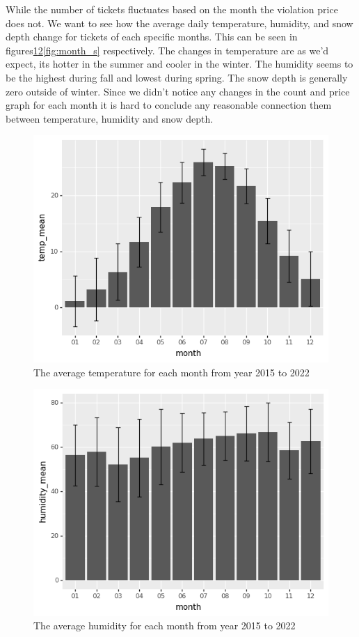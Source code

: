 \documentclass[12pt]{fphw}
\begin{document}
While the number of tickets fluctuates based on the month the violation price does not.
We want to see how the average daily temperature, humidity, and snow depth change for tickets of each specific months. This can be seen in figures\ref{fig:month_t}\ref{fig:month_h}\ref{fig:month_s} respectively.
The changes in temperature are as we'd expect, its hotter in the summer and cooler in the winter. The humidity seems to be the highest during fall and lowest during spring. The snow depth is generally zero outside of winter.
Since we didn't notice any changes in the count and price graph for each month it is hard to conclude any reasonable connection them between temperature, humidity and snow depth.


\begin{figure}[h!]
  \label{fig:month_t}
  \includegraphics[width=1\textwidth]{figures2/Month_temp.png}
  \caption{The average temperature for each month from year 2015 to 2022}
\end{figure}

\begin{figure}[h!]
  \label{fig:month_h}
  \includegraphics[width=1\textwidth]{figures2/Month_humidity.png}
  \caption{The average humidity for each month from year 2015 to 2022}
\end{figure}
\end{document}
